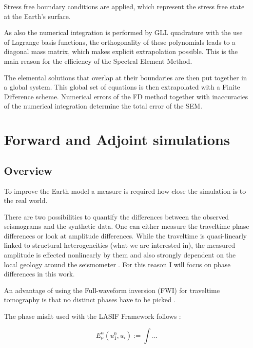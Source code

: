 Stress free boundary conditions are applied, which represent the stress free state at the Earth's surface. 

As also the numerical integration is performed by GLL quadrature with the use of Lagrange basis functions, the orthogonality of these polynomials 
leads to a diagonal mass matrix, which makes explicit extrapolation possible. This is the main reason for the efficiency of the Spectral Element Method.

The elemental solutions that overlap at their boundaries are then put together in a global system. 
This global set of equations is then extrapolated with a Finite Difference scheme.
Numerical errors of the FD method together with inaccuracies of the numerical integration determine the total error of the SEM.



\section{Forward and Adjoint simulations}


\subsection{Overview}
To improve the Earth model a measure is required how close the simulation is to the real world. 

There are two possibilities to quantify the differences between the observed seismograms and the synthetic data.
One can either measure the traveltime phase differences or look at amplitude differences.
While the traveltime is quasi-linearly linked to structural heterogeneities (what we are interested in),
the measured amplitude is effected nonlinearly by them and also strongly dependent on the local geology 
around the seismometer \citep{Fichtner2008}.
For this reason I will focus on phase differences in this work.

An advantage of using the Full-waveform inversion (FWI) for traveltime tomography is that no distinct phases 
have to be picked \citep{Fichtner2008}.

The phase misfit used with the LASIF Framework follows \citep{Fichtner2008}:

\begin{equation} %
E_p^n(u_1^0, u_i) := \int ...
\end{equation}

